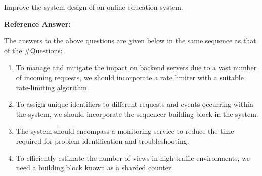 Improve the system design of an online education system.

\textbf{Reference Answer:}

The answers to the above questions are given below in the same sequence as that of the \#Questions:

\begin{enumerate}
\def\labelenumi{\arabic{enumi}.}
\tightlist
\item
To manage and mitigate the impact on backend servers due to a vast number of incoming requests, we should incorporate a rate limiter with a suitable rate-limiting algorithm.
\item
To assign unique identifiers to different requests and events occurring within the system, we should incorporate the sequencer building block in the system.
\item
The system should encompass a monitoring service to reduce the time required for problem identification and troubleshooting.
\item
To efficiently estimate the number of views in high-traffic environments, we need a building block known as a sharded counter.
\end{enumerate}

